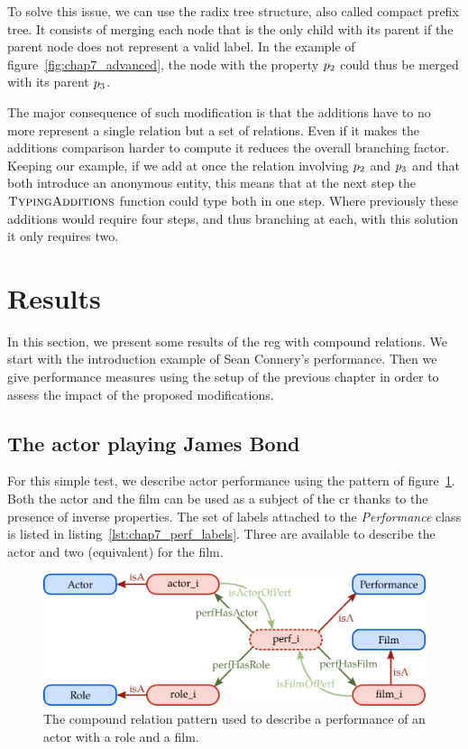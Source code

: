 To solve this issue, we can use the radix tree structure, also called compact prefix tree. It consists of merging each node that is the only child with its parent if the parent node does not represent a valid label. In the example of figure~\ref{fig:chap7_advanced}, the node with the property $p_2$ could thus be merged with its parent $p_3$.

The major consequence of such modification is that the additions have to no more represent a single relation but a set of relations. Even if it makes the additions comparison harder to compute it reduces the overall branching factor. Keeping our example, if we add at once the relation involving $p_2$ and $p_3$ and that both introduce an anonymous entity, this means that at the next step the $\textsc{TypingAdditions}$ function could type both in one step. Where previously these additions would require four steps, and thus branching at each, with this solution it only requires two.

\section{Results}

In this section, we present some results of the \acrshort{reg} with compound relations. We start with the introduction example of Sean Connery's performance. Then we give performance measures using the setup of the previous chapter in order to assess the impact of the proposed modifications. 

\subsection{The actor playing James Bond}

For this simple test, we describe actor performance using the pattern of figure~\ref{fig:chap7_perf}. Both the actor and the film can be used as a subject of the \acrshort{cr} thanks to the presence of inverse properties. The set of labels attached to the \textit{Performance} class is listed in listing~\ref{lst:chap7_perf_labels}. Three are available to describe the actor and two (equivalent) for the film.

\begin{figure}[ht!]
\centering
\includegraphics[scale=0.4]{figures/chapter7/perf.png}
\caption{\label{fig:chap7_perf} The compound relation pattern used to describe a performance of an actor with a role and a film.}
\end{figure}

